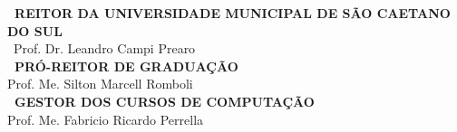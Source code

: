 
\newenvironment{estrutura}
 {
  \clearpage            %
  \pagestyle{empty}     %
 }
 {
  \clearpage            %
 }

\begin{estrutura}

  \center
    \vspace*{\fill}	
    
    {\ABNTEXchapterfont\bfseries\ REITOR DA UNIVERSIDADE MUNICIPAL DE SÃO CAETANO DO SUL} \\
    \ABNTEXchapterfont\ {Prof. Dr. Leandro Campi Prearo} \\
    \vspace{0.5cm}
    {\ABNTEXchapterfont\bfseries\ PRÓ-REITOR DE GRADUAÇÃO} \\
    Prof. Me. Silton Marcell Romboli \\
    \vspace{0.5cm}
     {\ABNTEXchapterfont\bfseries\ GESTOR DOS CURSOS DE COMPUTAÇÃO} \\
    Prof. Me. Fabricio Ricardo Perrella

    \vspace*{1cm}
\end{estrutura}
